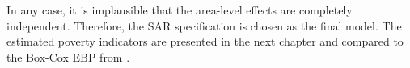 In any case, it is implausible that the area-level effects are completely independent.
Therefore, the SAR specification is chosen as the final model.
The estimated poverty indicators are presented in the next chapter and compared to the Box-Cox EBP from \cite{rojas_perilla_data_2020}.












